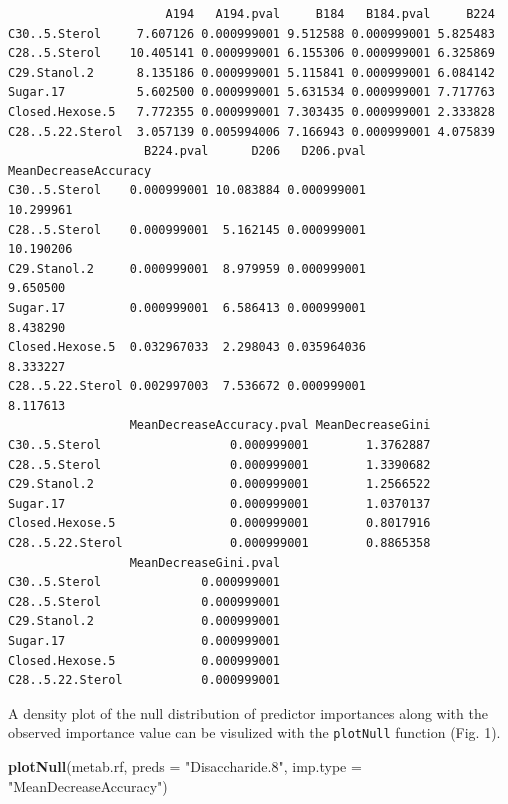\documentclass[]{article}
\newenvironment{Shaded}{\begin{snugshade}}{\end{snugshade}}
\newcommand{\KeywordTok}[1]{\textcolor[rgb]{0.13,0.29,0.53}{\textbf{{#1}}}}
\newcommand{\DataTypeTok}[1]{\textcolor[rgb]{0.13,0.29,0.53}{{#1}}}
\newcommand{\StringTok}[1]{\textcolor[rgb]{0.31,0.60,0.02}{{#1}}}
\newcommand{\NormalTok}[1]{{#1}}
\begin{document}
\begin{verbatim}
                      A194   A194.pval     B184   B184.pval     B224
C30..5.Sterol     7.607126 0.000999001 9.512588 0.000999001 5.825483
C28..5.Sterol    10.405141 0.000999001 6.155306 0.000999001 6.325869
C29.Stanol.2      8.135186 0.000999001 5.115841 0.000999001 6.084142
Sugar.17          5.602500 0.000999001 5.631534 0.000999001 7.717763
Closed.Hexose.5   7.772355 0.000999001 7.303435 0.000999001 2.333828
C28..5.22.Sterol  3.057139 0.005994006 7.166943 0.000999001 4.075839
                   B224.pval      D206   D206.pval MeanDecreaseAccuracy
C30..5.Sterol    0.000999001 10.083884 0.000999001            10.299961
C28..5.Sterol    0.000999001  5.162145 0.000999001            10.190206
C29.Stanol.2     0.000999001  8.979959 0.000999001             9.650500
Sugar.17         0.000999001  6.586413 0.000999001             8.438290
Closed.Hexose.5  0.032967033  2.298043 0.035964036             8.333227
C28..5.22.Sterol 0.002997003  7.536672 0.000999001             8.117613
                 MeanDecreaseAccuracy.pval MeanDecreaseGini
C30..5.Sterol                  0.000999001        1.3762887
C28..5.Sterol                  0.000999001        1.3390682
C29.Stanol.2                   0.000999001        1.2566522
Sugar.17                       0.000999001        1.0370137
Closed.Hexose.5                0.000999001        0.8017916
C28..5.22.Sterol               0.000999001        0.8865358
                 MeanDecreaseGini.pval
C30..5.Sterol              0.000999001
C28..5.Sterol              0.000999001
C29.Stanol.2               0.000999001
Sugar.17                   0.000999001
Closed.Hexose.5            0.000999001
C28..5.22.Sterol           0.000999001
\end{verbatim}

A density plot of the null distribution of predictor importances along
with the observed importance value can be visulized with the
\texttt{plotNull} function (Fig. 1).

\begin{Shaded}
\begin{Highlighting}[]
\KeywordTok{plotNull}\NormalTok{(metab.rf, }\DataTypeTok{preds =} \StringTok{"Disaccharide.8"}\NormalTok{, }\DataTypeTok{imp.type =} \StringTok{"MeanDecreaseAccuracy"}\NormalTok{)}
\end{Highlighting}
\end{Shaded}
\end{document}
